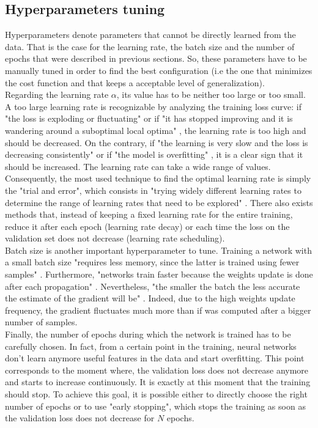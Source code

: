 \subsection{Hyperparameters tuning}
Hyperparameters denote parameters that cannot be directly learned from the data. That is the case for the learning rate, the batch size and the number of epochs that were described in previous sections. So, these parameters have to be manually tuned in order to find the best configuration (i.e the one that minimizes the cost function and that keeps a acceptable level of generalization).\\
Regarding the learning rate $\alpha$, its value has to be neither too large or too small. A too large learning rate is recognizable by analyzing the training loss curve: if "the loss is exploding or fluctuating" or if "it has stopped improving and it is wandering around a suboptimal local optima" \cite{28}, the learning rate is too high and should be decreased. On the contrary, if "the learning is very slow and the loss is decreasing consistently" or if "the model is overfitting" \cite{28}, it is a clear sign that it should be increased.
The learning rate can take a wide range of values. Consequently, the most used technique to find the optimal learning rate is simply the "trial and error", which consists in "trying widely different learning rates to determine the range of learning rates that need to be explored" \cite{28}. There also exists methods that, instead of keeping a fixed learning rate for the entire training, reduce it after each epoch (learning rate decay) or each time the loss on the validation set does not decrease (learning rate scheduling).\\
Batch size is another important hyperparameter to tune. Training a network with a small batch size "requires less memory, since the latter is trained using fewer samples" \cite{29}. Furthermore, "networks train faster because the weights update is done after each propagation" \cite{29}. Nevertheless, "the smaller the batch the less accurate the estimate of the gradient will be" \cite{29}. Indeed, due to the high weights update frequency, the gradient fluctuates much more than if was computed after a bigger number of samples.\\
Finally, the number of epochs during which the network is trained has to be carefully chosen. In fact, from a certain point in the training, neural networks don't learn anymore useful features in the data and start overfitting. This point corresponds to the moment where, the validation loss does not decrease anymore and starts to increase continuously. It is exactly at this moment that the training should stop. To achieve this goal, it is possible either to directly choose the right number of epochs or to use "early stopping", which stops the training as soon as the validation loss does not decrease for $N$ epochs.



